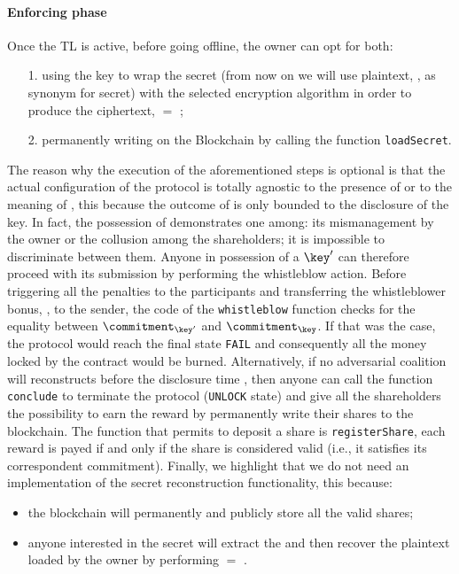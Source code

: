 \paragraph{Enforcing phase}
Once the TL is active, before going offline, the owner can opt for both:
\begin{itemize}
	\item[1.] using the key to wrap the secret (from now on we will use plaintext, \plaintext, as synonym for secret) with the selected encryption algorithm in order to produce the ciphertext, \ciphertext $=$ \wrap;
	\item[2.] permanently writing \ciphertext on the Blockchain by calling the function \texttt{loadSecret}.
\end{itemize}
The reason why the execution of the aforementioned steps is optional is that the actual configuration of the protocol is totally agnostic to the presence of \ciphertext or to the meaning of \secret, this because the outcome of \shortname is only bounded to the disclosure of the key. 
In fact, the possession of \key demonstrates one among: its mismanagement by the owner or the collusion among the shareholders; it is impossible to discriminate between them.   
Anyone in possession of a $\key \sp{\prime} $ can therefore proceed with its submission by performing the whistleblow action. 
Before  triggering all the penalties to the participants and transferring the whistleblower bonus, \Wbonus, to the sender, the code of the \texttt{whistleblow} function checks for the equality between  $\commitment _ { \key \sp{\prime} } $ and $\commitment _ \key $. 
If that was the case, the protocol would reach the final state \texttt{FAIL} and consequently all the money locked by the contract would be burned.
Alternatively, if no adversarial coalition will reconstructs \key before the disclosure time \td, then anyone can call the function \texttt{conclude} to terminate the protocol (\texttt{UNLOCK} state) and give all the shareholders the possibility to earn the reward by permanently write their shares to the blockchain. The function that permits to deposit a share is \texttt{registerShare}, each reward is payed if and only if the share is considered valid (i.e., it satisfies its correspondent commitment).
\newline
Finally, we highlight that we do not need an implementation of the secret reconstruction functionality, this because:
\begin{itemize}
	\item the blockchain will permanently and publicly store all the valid shares; 
	\item anyone interested in the secret will extract the \key and then recover the plaintext loaded by the owner by performing \plaintext $=$ \unwrap.
\end{itemize} 



